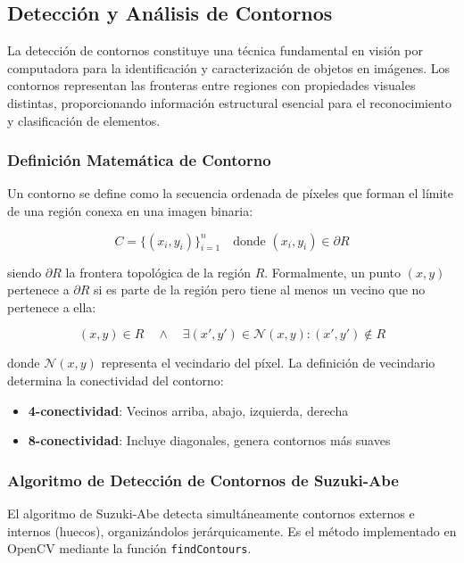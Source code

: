 \subsection{Detección y Análisis de Contornos}

La detección de contornos constituye una técnica fundamental en visión por computadora para la identificación y caracterización de objetos en imágenes. Los contornos representan las fronteras entre regiones con propiedades visuales distintas, proporcionando información estructural esencial para el reconocimiento y clasificación de elementos.

\subsubsection{Definición Matemática de Contorno}

Un contorno se define como la secuencia ordenada de píxeles que forman el límite de una región conexa en una imagen binaria:

\begin{equation}
C = \{(x_i, y_i)\}_{i=1}^{n} \quad \text{donde } (x_i, y_i) \in \partial R
\end{equation}

siendo $\partial R$ la frontera topológica de la región $R$. Formalmente, un punto $(x,y)$ pertenece a $\partial R$ si es parte de la región pero tiene al menos un vecino que no pertenece a ella:

\begin{equation}
(x,y) \in R \quad \land \quad \exists (x',y') \in \mathcal{N}(x,y) : (x',y') \notin R
\end{equation}

donde $\mathcal{N}(x,y)$ representa el vecindario del píxel. La definición de vecindario determina la conectividad del contorno:
\begin{itemize}
\item \textbf{4-conectividad}: Vecinos arriba, abajo, izquierda, derecha
\item \textbf{8-conectividad}: Incluye diagonales, genera contornos más suaves
\end{itemize}

\subsubsection{Algoritmo de Detección de Contornos de Suzuki-Abe}

El algoritmo de Suzuki-Abe detecta simultáneamente contornos externos e internos (huecos), organizándolos jerárquicamente. Es el método implementado en OpenCV mediante la función \texttt{findContours}.

